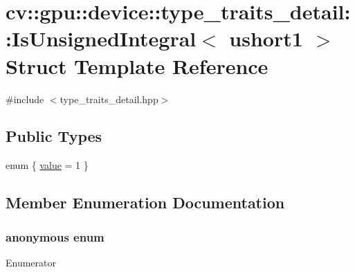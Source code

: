 \hypertarget{structcv_1_1gpu_1_1device_1_1type__traits__detail_1_1IsUnsignedIntegral_3_01ushort1_01_4}{\section{cv\-:\-:gpu\-:\-:device\-:\-:type\-\_\-traits\-\_\-detail\-:\-:Is\-Unsigned\-Integral$<$ ushort1 $>$ Struct Template Reference}
\label{structcv_1_1gpu_1_1device_1_1type__traits__detail_1_1IsUnsignedIntegral_3_01ushort1_01_4}
}


{\ttfamily \#include $<$type\-\_\-traits\-\_\-detail.\-hpp$>$}

\subsection*{Public Types}
\begin{DoxyCompactItemize}
\item 
enum \{ \hyperlink{structcv_1_1gpu_1_1device_1_1type__traits__detail_1_1IsUnsignedIntegral_3_01ushort1_01_4_a72d139a2cb2a4003a3d8545da89c9918a3d5c1204dda1d65f067046509197e29f}{value} = 1
 \}
\end{DoxyCompactItemize}


\subsection{Member Enumeration Documentation}
\hypertarget{structcv_1_1gpu_1_1device_1_1type__traits__detail_1_1IsUnsignedIntegral_3_01ushort1_01_4_a72d139a2cb2a4003a3d8545da89c9918}{\subsubsection[{anonymous enum}]{\setlength{\rightskip}{0pt plus 5cm}anonymous enum}}\label{structcv_1_1gpu_1_1device_1_1type__traits__detail_1_1IsUnsignedIntegral_3_01ushort1_01_4_a72d139a2cb2a4003a3d8545da89c9918}
\begin{Desc}
\item[Enumerator]\par
\begin{description}
\item[{\em 
\hypertarget{structcv_1_1gpu_1_1device_1_1type__traits__detail_1_1IsUnsignedIntegral_3_01ushort1_01_4_a72d139a2cb2a4003a3d8545da89c9918a3d5c1204dda1d65f067046509197e29f}{value}\label{structcv_1_1gpu_1_1device_1_1type__traits__detail_1_1IsUnsignedIntegral_3_01ushort1_01_4_a72d139a2cb2a4003a3d8545da89c9918a3d5c1204dda1d65f067046509197e29f}
}]\end{description}
\end{Desc}


